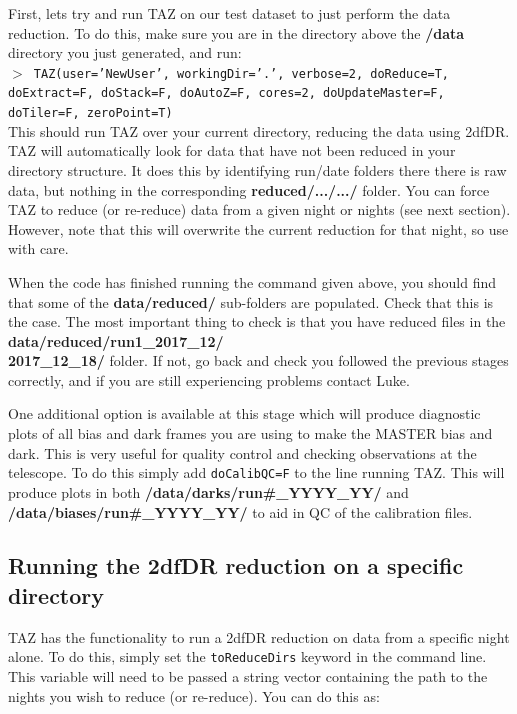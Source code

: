 \documentclass[12pt]{article}
\begin{document}
First, lets try and run TAZ on our test dataset to just perform the data reduction. To do this, make sure you are in the directory above the \textbf{/data} directory you just generated, and run:\\

\hspace{10mm} \texttt{$>$ TAZ(user='NewUser', workingDir='.', verbose=2, doReduce=T, doExtract=F, doStack=F, doAutoZ=F, cores=2, doUpdateMaster=F, doTiler=F, zeroPoint=T)}\\

This should run TAZ over your current directory, reducing the data using 2dfDR. TAZ will automatically look for data that have not been reduced in your directory structure. It does this by identifying run/date folders there there is raw data, but nothing in the corresponding \textbf{reduced/.../.../} folder. You can force TAZ to reduce (or re-reduce) data from a given night or nights (see next section). However, note that this will overwrite the current reduction for that night, so use with care. 

When the code has finished running the command given above, you should find that some of the \textbf{data/reduced/} sub-folders are populated. Check that this is the case. The most important thing to check is that you have reduced files in the \textbf{data/reduced/run1\_2017\_12/ \\ 2017\_12\_18/} folder.  If not, go back and check you followed the previous stages correctly, and if you are still experiencing problems contact Luke.  

One additional option is available at this stage which will produce diagnostic plots of all bias and dark frames you are using to make the MASTER bias and dark. This is very useful for quality control and checking observations at the telescope. To do this simply add \texttt{doCalibQC=F} to the line running TAZ. This will produce plots in both \textbf{/data/darks/run\#\_YYYY\_YY/} and \textbf{/data/biases/run\#\_YYYY\_YY/} to aid in QC of the calibration files.

\subsection{Running the 2dfDR reduction on a specific directory}

TAZ has the functionality to run a 2dfDR reduction on data from a specific night alone. To do this, simply set the \texttt{toReduceDirs} keyword in the command line. This variable will need to be passed a string vector containing the path to the nights you wish to reduce (or re-reduce). You can do this as: \\
\end{document}

